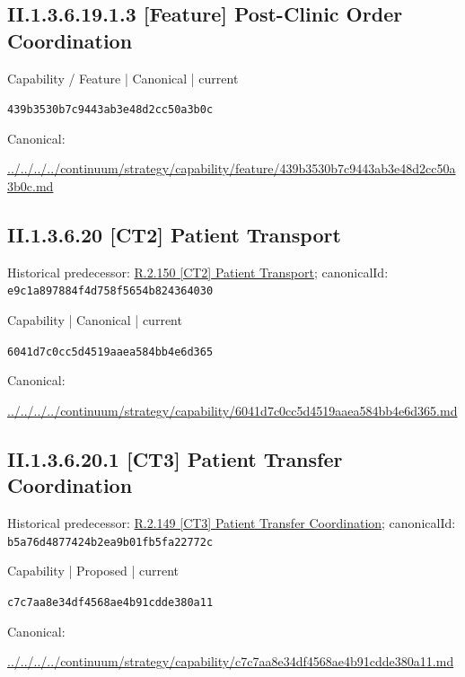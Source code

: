 \documentclass[10pt,a4paper]{article}
\begin{document}
\subsection*{II.1.3.6.19.1.3 [Feature] Post-Clinic Order Coordination}
\label{element-439b3530b7c9443ab3e48d2cc50a3b0c}
{\small Capability / Feature | Canonical | current}\par
\texttt{439b3530b7c9443ab3e48d2cc50a3b0c}\par
Canonical: \par
{\footnotesize\url{../../../../continuum/strategy/capability/feature/439b3530b7c9443ab3e48d2cc50a3b0c.md}}\par
\subsection*{II.1.3.6.20 [CT2] Patient Transport}
Historical predecessor: \hyperref[element-e9c1a897884f4d758f5654b824364030]{R.2.150 [CT2] Patient Transport}; canonicalId: \texttt{e9c1a897884f4d758f5654b824364030}\par
\label{element-6041d7c0cc5d4519aaea584bb4e6d365}
{\small Capability | Canonical | current}\par
\texttt{6041d7c0cc5d4519aaea584bb4e6d365}\par
Canonical: \par
{\footnotesize\url{../../../../continuum/strategy/capability/6041d7c0cc5d4519aaea584bb4e6d365.md}}\par
\subsection*{II.1.3.6.20.1 [CT3] Patient Transfer Coordination}
Historical predecessor: \hyperref[element-b5a76d4877424b2ea9b01fb5fa22772c]{R.2.149 [CT3] Patient Transfer Coordination}; canonicalId: \texttt{b5a76d4877424b2ea9b01fb5fa22772c}\par
\label{element-c7c7aa8e34df4568ae4b91cdde380a11}
{\small Capability | Proposed | current}\par
\texttt{c7c7aa8e34df4568ae4b91cdde380a11}\par
Canonical: \par
{\footnotesize\url{../../../../continuum/strategy/capability/c7c7aa8e34df4568ae4b91cdde380a11.md}}\par
\end{document}
